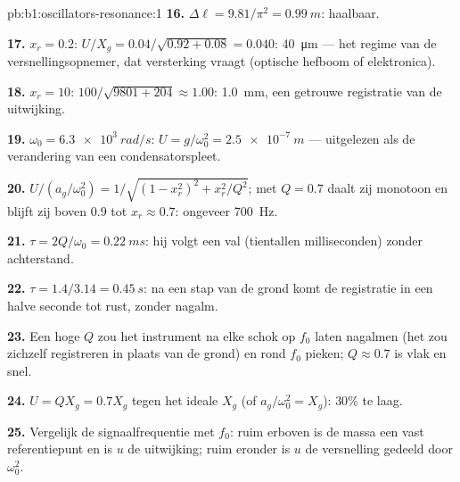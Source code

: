 \begin{solution}{pb:b1:oscillators-resonance:1}
\textbf{16.} $\Delta\ell = 9.81/\pi^2 = \qty{0.99}{m}$: haalbaar.

\textbf{17.} $x_r = 0.2$: $U/X_g = 0.04/\sqrt{0.92 + 0.08} = 0.040$:
\qty{40}{\micro m} --- het regime van de versnellingsopnemer, dat versterking vraagt (optische
hefboom of elektronica).

\textbf{18.} $x_r = 10$: $100/\sqrt{9801 + 204} \approx 1.00$: \qty{1.0}{mm},
een getrouwe registratie van de uitwijking.

\textbf{19.} $\omega_0 = \qty{6.3e3}{rad/s}$: $U = g/\omega_0^2 = \qty{2.5e-7}{m}$
--- uitgelezen als de verandering van een condensatorspleet.

\textbf{20.} $U/(a_g/\omega_0^2) = 1/\sqrt{(1 - x_r^2)^2 + x_r^2/Q^2}$; met
$Q = 0.7$ daalt zij monotoon en blijft zij boven $0.9$ tot
$x_r \approx 0.7$: ongeveer \qty{700}{Hz}.

\textbf{21.} $\tau = 2Q/\omega_0 = \qty{0.22}{ms}$: hij volgt een val (tientallen
milliseconden) zonder achterstand.

\textbf{22.} $\tau = 1.4/3.14 = \qty{0.45}{s}$: na een stap van de grond komt de
registratie in een halve seconde tot rust, zonder nagalm.

\textbf{23.} Een hoge $Q$ zou het instrument na elke schok op $f_0$ laten
nagalmen (het zou zichzelf registreren in plaats van de grond) en rond
$f_0$ pieken; $Q \approx 0.7$ is vlak en snel.

\textbf{24.} $U = QX_g = 0.7X_g$ tegen het ideale $X_g$ (of $a_g/\omega_0^2
= X_g$): $30\%$ te laag.

\textbf{25.} Vergelijk de signaalfrequentie met $f_0$: ruim erboven is de
massa een vast referentiepunt en is $u$ de uitwijking; ruim eronder is $u$
de versnelling gedeeld door $\omega_0^2$.
\end{solution}
